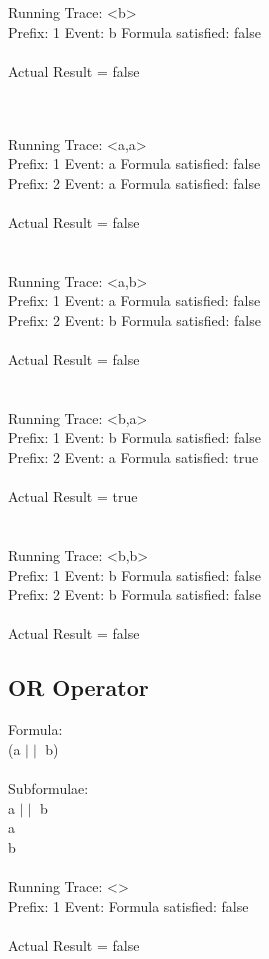 \noindent Running Trace: \textless b\textgreater\\
  Prefix: 1 Event: b Formula satisfied: false\\
\\
Actual Result = false\\
\\
\\
\newpage

\noindent Running Trace: \textless a,a\textgreater\\
  Prefix: 1 Event: a Formula satisfied: false\\
  Prefix: 2 Event: a Formula satisfied: false\\
\\
Actual Result = false\\
\\
\\
Running Trace: \textless a,b\textgreater\\
  Prefix: 1 Event: a Formula satisfied: false\\
  Prefix: 2 Event: b Formula satisfied: false\\
\\
Actual Result = false\\
\\
\\
Running Trace: \textless b,a\textgreater\\
  Prefix: 1 Event: b Formula satisfied: false\\
  Prefix: 2 Event: a Formula satisfied: true\\
\\
Actual Result = true\\
\\
\\
Running Trace: \textless b,b\textgreater\\
  Prefix: 1 Event: b Formula satisfied: false\\
  Prefix: 2 Event: b Formula satisfied: false\\
\\
Actual Result = false\\

\subsection{OR Operator}

Formula:\\
(a $\mid\mid$ b)\\
\\
Subformulae:\\
a $\mid\mid$ b\\
a\\
b\\
\\
Running Trace: \textless \textgreater\\
  Prefix: 1 Event:  Formula satisfied: false\\
\\
Actual Result = false\\


